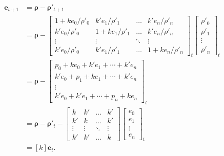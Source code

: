 \documentclass[11pt,letterpaper]{article}
\begin{document}
	\begin{align*}
		\bm e_{t + 1} &= \bm \rho - \bm \rho'_{t + 1} \\
		&= \bm \rho - \begin{bmatrix}
			1 + k e_0 / \rho'_0 & k' e_1 / \rho'_1 & \dots & k' e_n / \rho'_n \\
			k' e_0 / \rho'_0 & 1 + k e_1 / \rho'_1 & \dots & k' e_n / \rho'_n \\
			\vdots & \vdots & \ddots & \vdots \\
			k' e_0 / \rho'_0 & k' e_1 / \rho'_1 & \dots & 1 + k e_n / \rho'_n
		\end{bmatrix}_t \begin{bmatrix} \rho'_0 \\ \rho'_1 \\ \vdots \\ \rho'_n \end{bmatrix}_t \\
		&= \bm \rho - \begin{bmatrix}
			p_0 + k e_0 + k' e_1 + \cdots + k' e_n \\
			k' e_0 + p_1 + k e_1 + \cdots + k' e_n \\
			\vdots \\
			k' e_0 + k' e_1 + \cdots + p_n + k e_n
		\end{bmatrix}_t \\
		&= \bm \rho - \bm \rho'_t - \begin{bmatrix}
			k & k' & \dots & k' \\
			k' & k & \dots & k' \\
			\vdots & \vdots & \ddots & \vdots \\
			k' & k' & \dots & k
		\end{bmatrix} \begin{bmatrix}
			e_0 \\ e_1 \\ \vdots \\ e_n
		\end{bmatrix}_t \\
		&= [k] \bm e_t.
	\end{align*}

	
\end{document}
